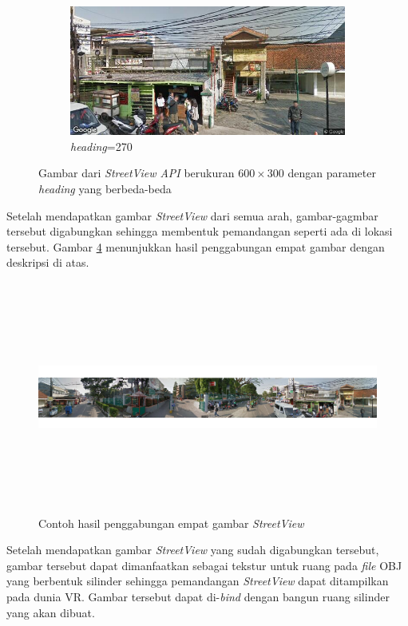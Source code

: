 \begin{figure}[]
\begin{subfigure}{.5\textwidth}
  		\label{fig:streetview180}
	\end{subfigure}
	\begin{subfigure}{.5\textwidth}
  		\centering
  		\includegraphics[width=1\linewidth]{Gambar/streetview270.png}
  		\caption{\textit{heading}=270}
  		\label{fig:streetview270}
	\end{subfigure}
	\caption{Gambar dari \textit{StreetView API} berukuran $600\times300$  dengan parameter \textit{heading} yang berbeda-beda}
\label{fig:comp-streetview}
\end{figure}

Setelah mendapatkan gambar \textit{StreetView} dari semua arah, gambar-gagmbar tersebut digabungkan sehingga membentuk pemandangan seperti ada di lokasi tersebut. Gambar \ref{fig:streetview-vr} menunjukkan hasil penggabungan empat gambar dengan deskripsi di atas.

\begin{figure}[h]
	\centering
		\includegraphics[width=6.5in,height=3in]{Gambar/connected_streetview.png}
	\caption{Contoh hasil penggabungan empat gambar \textit{StreetView}}
	\label{fig:streetview-vr}
\end{figure}

Setelah mendapatkan gambar \textit{StreetView} yang sudah digabungkan tersebut, gambar tersebut dapat dimanfaatkan sebagai tekstur untuk ruang pada \textit{file} OBJ yang berbentuk silinder sehingga pemandangan \textit{StreetView} dapat ditampilkan pada dunia VR. Gambar tersebut dapat di-\textit{bind} dengan bangun ruang silinder yang akan dibuat.

